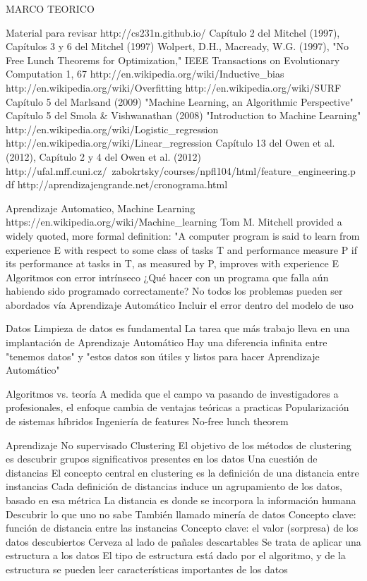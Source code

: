 MARCO TEORICO

Material para revisar
http://cs231n.github.io/
Capítulo 2 del Mitchel (1997), Capítulos 3 y 6 del Mitchel (1997)
Wolpert, D.H., Macready, W.G. (1997), "No Free Lunch Theorems for Optimization," IEEE Transactions on Evolutionary Computation 1, 67
http://en.wikipedia.org/wiki/Inductive_bias
http://en.wikipedia.org/wiki/Overfitting
http://en.wikipedia.org/wiki/SURF
Capítulo 5 del Marlsand (2009) "Machine Learning, an Algorithmic Perspective"
Capítulo 5 del Smola & Vishwanathan (2008) "Introduction to Machine Learning"
http://en.wikipedia.org/wiki/Logistic_regression
http://en.wikipedia.org/wiki/Linear_regression
Capítulo 13 del Owen et al. (2012), Capítulo 2 y 4 del Owen et al. (2012)
http://ufal.mff.cuni.cz/~zabokrtsky/courses/npfl104/html/feature_engineering.pdf
http://aprendizajengrande.net/cronograma.html



Aprendizaje Automatico, Machine Learning
https://en.wikipedia.org/wiki/Machine_learning
Tom M. Mitchell provided a widely quoted, more formal definition: "A computer program is said to learn from experience E with respect to some class of tasks T and 
performance measure P if its performance at tasks in T, as measured by P, improves with experience E
Algoritmos con error intrínseco
¿Qué hacer con un programa que falla aún habiendo sido programado correctamente?
No todos los problemas pueden ser abordados vía Aprendizaje Automático
Incluir el error dentro del modelo de uso

Datos
Limpieza de datos es fundamental
La tarea que más trabajo lleva en una implantación de Aprendizaje Automático
Hay una diferencia infinita entre "tenemos datos" y "estos datos son útiles y listos para hacer Aprendizaje Automático"


Algoritmos vs. teoría
A medida que el campo va pasando de investigadores a profesionales, el enfoque cambia de ventajas teóricas a practicas
Popularización de sistemas híbridos
Ingeniería de features
No-free lunch theorem


Aprendizaje No supervisado 
Clustering
El objetivo de los métodos de clustering es descubrir grupos significativos presentes en los datos
Una cuestión de distancias
El concepto central en clustering es la definición de una distancia entre instancias
Cada definición de distancias induce un agrupamiento de los datos, basado en esa métrica
La distancia es donde se incorpora la información humana
Descubrir lo que uno no sabe
También llamado minería de datos
Concepto clave: función de distancia entre las instancias
Concepto clave: el valor (sorpresa) de los datos descubiertos
Cerveza al lado de pañales descartables
Se trata de aplicar una estructura a los datos
El tipo de estructura está dado por el algoritmo, y de la estructura se pueden leer características importantes de los datos

